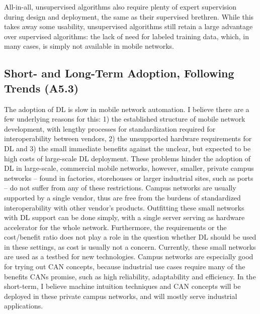 			All-in-all, unsupervised algorithms also require plenty of expert supervision during design and deployment, the same as their supervised brethren.
			While this takes away some usability, unsupervised algorithms still retain a large advantage over supervised algorithms: the lack of need for labeled training data, which, in many cases, is simply not available in mobile networks.

		\subsection{Short- and Long-Term Adoption, Following Trends (A5.3)}
			
			The adoption of \ac{DL} is slow in mobile network automation.
			I believe there are a few underlying reasons for this: 1) the established structure of mobile network development, with lengthy processes for standardization required for interoperability between vendors, 2) the unsupported hardware requirements for \ac{DL} and 3) the small immediate benefits against the unclear, but expected to be high costs of large-scale \ac{DL} deployment.
			These problems hinder the adoption of \ac{DL} in large-scale, commercial mobile networks, however, smaller, private campus networks -- found in factories, storehouses or larger industrial sites, such as ports -- do not suffer from any of these restrictions.			
			Campus networks are usually supported by a single vendor, thus are free from the burdens of standardized interoperability with other vendor's products.
			Outfitting these small networks with \ac{DL} support can be done simply, with a single server serving as hardware accelerator for the whole network.
			Furthermore, the requirements or the cost/benefit ratio does not play a role in the question whether \ac{DL} should be used in these settings, as cost is usually not a concern.
			Currently, these small networks are used as a testbed for new technologies.
			Campus networks are especially good for trying out \ac{CAN} concepts, because industrial use cases require many of the benefits \acp{CAN} promise, such as high reliability, adaptability and efficiency.
			In the short-term, I believe machine intuition techniques and \ac{CAN} concepts will be deployed in these private campus networks, and will mostly serve industrial applications.
			

